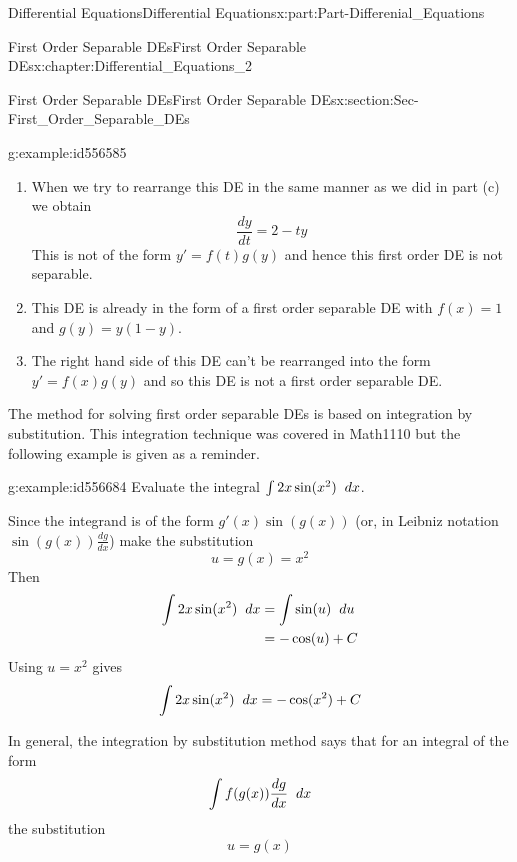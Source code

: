 \documentclass[oneside,10pt,]{book}
\numberwithin{equation}{section}
\newcommand{\amp}{&}
\begin{document}
\begin{partptx}{Differential Equations}{}{Differential Equations}{}{}{x:part:Part-Differenial_Equations}
\begin{chapterptx}{First Order Separable DEs}{}{First Order Separable DEs}{}{}{x:chapter:Differential_Equations_2}
\begin{sectionptx}{First Order Separable DEs}{}{First Order Separable DEs}{}{}{x:section:Sec-First_Order_Separable_DEs}
\begin{example}{}{g:example:id556585}
\begin{enumerate}[label=\alph*.]
and hence is a first order separable DE with \(f(t)=e^t\) and \(g(y)=y-3\).%
\item{}When we try to rearrange this DE in the same manner as we did in part (c) we obtain%
\begin{equation*}
\frac{dy}{dt}=2-ty
\end{equation*}
This is not of the form \(y'=f(t)g(y)\) and hence this first order DE is not separable.%
\item{}This DE is already in the form of a first order separable DE with \(f(x)=1\) and \(g(y)=y(1-y)\).%
\item{}The right hand side of this DE can’t be rearranged into the form \(y'=f(x)g(y)\) and so this DE is not a first order separable DE.%
\end{enumerate}
%
\end{example}
The method for solving first order separable DEs is based on integration by substitution. This integration technique was covered in Math1110 but the following example is given as a reminder.%
\begin{example}{}{g:example:id556684}%
Evaluate the integral \(\int 2x\sin(x^2) \hspace{2mm} dx\).%
\par\smallskip%
\noindent\hypertarget{g:solution:id556678}{}Since the integrand is of the form \(g'(x)\sin(g(x))\) (or, in Leibniz notation \(\sin(g(x))\frac{dg}{dx}\)) make the substitution%
\begin{equation*}
u=g(x)=x^2
\end{equation*}
Then %
\begin{align*}
\int 2x\sin(x^2)\hspace{2mm} dx \amp =\int \sin(u)\hspace{2mm} du\\
\amp =-\cos(u)+C
\end{align*}
%
 Using \(u=x^2\) gives%
\begin{equation*}
\int 2x\sin(x^2)\hspace{2mm} dx=-\cos(x^2)+C
\end{equation*}
%
\end{example}
In general, the integration by substitution method says that for an integral of the form%
\begin{equation*}
\int f(g(x))\frac{dg}{dx}\hspace{2mm} dx
\end{equation*}
the substitution%
\begin{equation*}
u=g(x)
\end{equation*}

\end{sectionptx}
\end{chapterptx}
\end{partptx}
\end{document}

